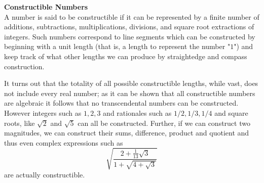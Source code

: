 \begin{framed}
\textbf{Constructible Numbers}\\ A number is said to be constructible if it can be represented by a finite number of additions, subtractions, multiplications, divisions, and square root extractions of integers. Such numbers correspond to line segments which can be constructed by beginning with a unit length (that is, a length to represent the number "$1$") and keep track of what  other lengths we can produce by straightedge and compass construction.

\myindent It turns out that the totality of all possible constructible lengths, while vast, does not include every real number; as it can be shown that all constructible numbers are algebraic it follows that no transcendental numbers can be constructed. However integers such as $1,2,3$ and rationales such as $1/2, 1/3, 1/4$ and square roots, like $\sqrt{2}$ and $\sqrt{5}$ can all be constructed. Further, if we can construct two  magnitudes, we can construct their sums, difference, product and quotient and thus even complex expressions such as
\[
\sqrt{\frac{2+\frac{1}{13}\sqrt{3}}{1 + \sqrt{4 + \sqrt{3}}}}
\]
are actually constructible.
\end{framed}
